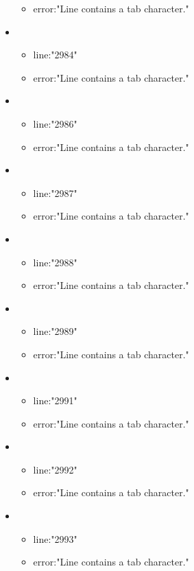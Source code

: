 \begin{itemize}
\begin{itemize}
		\item error:"Line contains a tab character." 
	\end{itemize}
	\item 
	\begin{itemize} 
		\item line:"2984" 
		\item error:"Line contains a tab character." 
	\end{itemize}
	\item 
	\begin{itemize} 
		\item line:"2986" 
		\item error:"Line contains a tab character." 
	\end{itemize}
	\item 
	\begin{itemize} 
		\item line:"2987" 
		\item error:"Line contains a tab character." 
	\end{itemize}
	\item 
	\begin{itemize} 
		\item line:"2988" 
		\item error:"Line contains a tab character." 
	\end{itemize}
	\item 
	\begin{itemize} 
		\item line:"2989" 
		\item error:"Line contains a tab character." 
	\end{itemize}
	\item 
	\begin{itemize} 
		\item line:"2991" 
		\item error:"Line contains a tab character." 
	\end{itemize}
	\item 
	\begin{itemize} 
		\item line:"2992" 
		\item error:"Line contains a tab character." 
	\end{itemize}
	\item 
	\begin{itemize} 
		\item line:"2993" 
		\item error:"Line contains a tab character." 
	\end{itemize}

\end{itemize}
